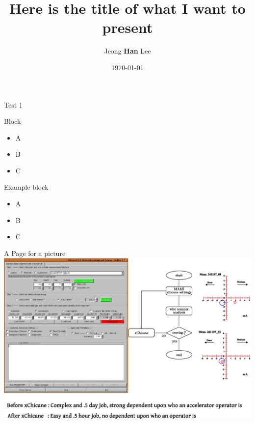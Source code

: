 \documentclass[
  9pt,
  table,
  ignorenonframetext
]{beamer}
\title{Here is the title of what I want to present}
\author{Jeong \textbf{Han} Lee}%
\institute{
  Integrated Control System Division\\
  \textbf{ESS}, Sweden
}
\date{\today}%
\begin{document}
\begin{frame}[plain]
  \titlepage
\end{frame}

\begin{frame}{Test 1}
  \begin{block}{Block}
    \begin{itemize}
    \item A
    \item B
    \item C
    \end{itemize}
  \end{block}
  \begin{exampleblock}{Example block}
    \begin{itemize}
    \item A
    \item B
    \item C
    \end{itemize}
  \end{exampleblock}
\end{frame}




\begin{frame}{A Page for a picture}
  \includegraphics[width=1.02\columnwidth]{./pictures/xchicane.eps}
\end{frame}
\end{document}
